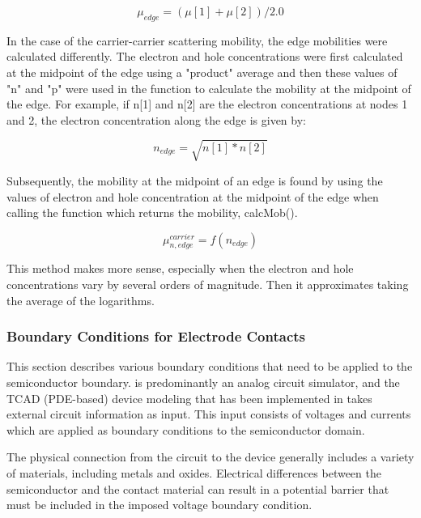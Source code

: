 \begin{equation}
  \mu_{edge} = (\mu [1] + \mu [2])/2.0
\end{equation}

In the case of the carrier-carrier scattering mobility, the edge mobilities
were calculated differently.  The electron and hole concentrations were
first calculated at the midpoint of the edge using a "product" average and then these
values of "n" and "p" were used in the function to calculate the mobility
at the midpoint of the edge.  For example, if n[1] and n[2] are the electron
concentrations at nodes 1 and 2, the electron concentration along the edge
is given by:

\begin{equation}
  n_{edge} = \sqrt{n[1]*n[2]}
\end{equation}

Subsequently, the mobility at the midpoint of an edge is found by using the
values of electron and hole concentration at the midpoint of the edge when
calling the function which returns the mobility, calcMob().


\begin{equation}
  \mu_{n, edge}^{carrier} = f(n_{edge})
\end{equation}

This method makes more sense, especially when the electron and hole
concentrations vary by several orders of magnitude.  Then it approximates
taking the average of the logarithms.

\subsubsection{Boundary Conditions for Electrode Contacts}
\label{boundaryCondition}

This section describes various boundary conditions that need to be applied
to the semiconductor boundary.  \Xyce{} is predominantly an analog circuit
simulator, and the TCAD (PDE-based) device modeling that has been implemented in
\Xyce{} takes external circuit information as input.  This input
consists of voltages and currents which are applied as boundary conditions 
to the semiconductor domain.  

The physical connection from the circuit to the device generally includes 
a variety of materials, including metals and oxides.  Electrical differences
between the semiconductor and the contact material can result in a potential
barrier that must be included in the imposed voltage boundary condition.

